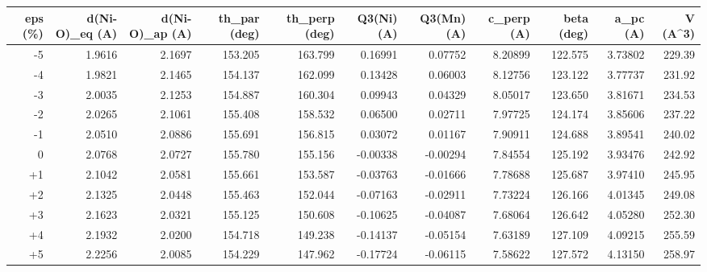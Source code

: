 \begin{tabular}{rrrrrrrrrrr}
\hline
eps (\%) & d(Ni-O)\_eq (A) & d(Ni-O)\_ap (A) & th\_par (deg) & th\_perp (deg) & Q3(Ni) (A) & Q3(Mn) (A) & c\_perp (A) & beta (deg) & a\_pc (A) & V (A^3) \\
\hline
-5 & 1.9616 & 2.1697 & 153.205 & 163.799 & 0.16991 & 0.07752 & 8.20899 & 122.575 & 3.73802 & 229.39 \\
-4 & 1.9821 & 2.1465 & 154.137 & 162.099 & 0.13428 & 0.06003 & 8.12756 & 123.122 & 3.77737 & 231.92 \\
-3 & 2.0035 & 2.1253 & 154.887 & 160.304 & 0.09943 & 0.04329 & 8.05017 & 123.650 & 3.81671 & 234.53 \\
-2 & 2.0265 & 2.1061 & 155.408 & 158.532 & 0.06500 & 0.02711 & 7.97725 & 124.174 & 3.85606 & 237.22 \\
-1 & 2.0510 & 2.0886 & 155.691 & 156.815 & 0.03072 & 0.01167 & 7.90911 & 124.688 & 3.89541 & 240.02 \\
0 & 2.0768 & 2.0727 & 155.780 & 155.156 & -0.00338 & -0.00294 & 7.84554 & 125.192 & 3.93476 & 242.92 \\
+1 & 2.1042 & 2.0581 & 155.661 & 153.587 & -0.03763 & -0.01666 & 7.78688 & 125.687 & 3.97410 & 245.95 \\
+2 & 2.1325 & 2.0448 & 155.463 & 152.044 & -0.07163 & -0.02911 & 7.73224 & 126.166 & 4.01345 & 249.08 \\
+3 & 2.1623 & 2.0321 & 155.125 & 150.608 & -0.10625 & -0.04087 & 7.68064 & 126.642 & 4.05280 & 252.30 \\
+4 & 2.1932 & 2.0200 & 154.718 & 149.238 & -0.14137 & -0.05154 & 7.63189 & 127.109 & 4.09215 & 255.59 \\
+5 & 2.2256 & 2.0085 & 154.229 & 147.962 & -0.17724 & -0.06115 & 7.58622 & 127.572 & 4.13150 & 258.97 \\
\hline
\end{tabular}

